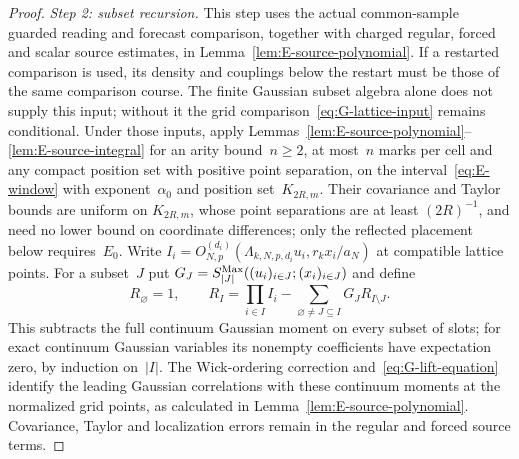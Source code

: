 \begin{proof}
\emph{Step 2: subset recursion.} This step uses the actual common-sample guarded reading and forecast comparison, together with charged regular, forced and scalar source estimates, in Lemma~\ref{lem:E-source-polynomial}. If a restarted comparison is used, its density and couplings below the restart must be those of the same comparison course. The finite Gaussian subset algebra alone does not supply this input; without it the grid comparison~\eqref{eq:G-lattice-input} remains conditional. Under those inputs, apply Lemmas~\ref{lem:E-source-polynomial}--\ref{lem:E-source-integral} for an arity bound~$n\ge2$, at most~$n$ marks per cell and any compact position set with positive point separation, on the interval~\eqref{eq:E-window} with exponent~$\alpha_0$ and position set~$K_{2R,m}$. Their covariance and Taylor bounds are uniform on $K_{2R,m}$, whose point separations are at least $(2R)^{-1}$, and need no lower bound on coordinate differences; only the reflected placement below requires~$E_0$. Write $I_i=O_{N,p}^{(d_i)}(\Lambda_{k,N,p,d_i}u_i,r_kx_i/a_N)$ at compatible lattice points. For a subset~$J$ put $G_J=S_{|J|}^{\rm Max}((u_i)_{i\in J};(x_i)_{i\in J})$ and define
\begin{equation*}
R_\varnothing=1,\qquad
R_I=\prod_{i\in I}I_i-\sum_{\varnothing\ne J\subseteq I}G_JR_{I\setminus J}.
\end{equation*}
This subtracts the full continuum Gaussian moment on every subset of slots; for exact continuum Gaussian variables its nonempty coefficients have expectation zero, by induction on~$|I|$. The Wick-ordering correction and~\eqref{eq:G-lift-equation} identify the leading Gaussian correlations with these continuum moments at the normalized grid points, as calculated in Lemma~\ref{lem:E-source-polynomial}. Covariance, Taylor and localization errors remain in the regular and forced source terms.


\end{proof}
